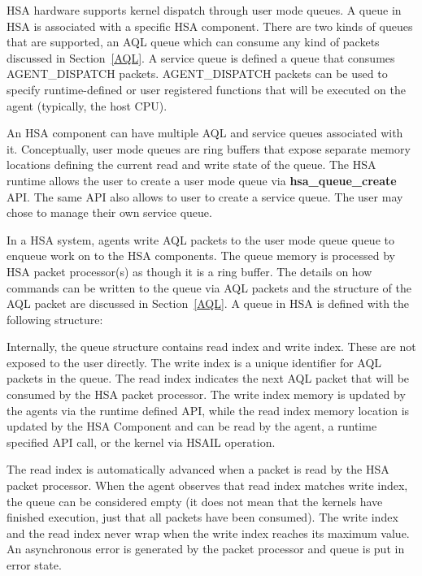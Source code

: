 \documentclass{book}
\newcommand{\reffun}[1]{\textbf{#1}}
\newcommand{\reftyp}[1]{#1}
\newcommand{\refenu}[1]{\reftyp{#1}}
\begin{document}
HSA hardware supports kernel dispatch through user mode queues.  A
queue in HSA is associated with a specific HSA component. There are
two kinds of queues that are supported, an AQL queue which can consume
any kind of packets discussed in Section~\ref{AQL}. A service queue is
defined a queue that consumes \refenu{AGENT\_DISPATCH}
packets. \refenu{AGENT\_DISPATCH} packets can be used to specify
runtime-defined or user registered functions that will be executed on
the agent (typically, the host CPU).

An HSA component can have multiple AQL and service queues associated
with it.  Conceptually, user mode queues are ring buffers that
expose separate memory locations defining the current read and write
state of the queue. The HSA runtime allows the user to create a user
mode queue via \reffun{hsa\_queue\_create} API. The same API also
allows to user to create a service queue. The user may chose to
manage their own service queue.

In a HSA system, agents write AQL packets to the user mode queue queue
to enqueue work on to the HSA components. The queue memory is
processed by HSA packet processor(s) as though it is a ring buffer.
The details on how commands can be written to the queue via AQL
packets and the structure of the AQL packet are discussed in
Section~\ref{AQL}. A queue in HSA is defined with the following
structure:



\vspace{-3mm}Internally, the queue structure contains read index and
write index.  These are not exposed to the user directly.  The write
index is a unique identifier for AQL packets in the queue. The read
index indicates the next AQL packet that will be consumed by the HSA
packet processor. The write index memory is updated by the agents via
the runtime defined API, while the read index memory location is
updated by the HSA Component and can be read by the agent, a runtime
specified API call, or the kernel via HSAIL operation.

The read index is automatically advanced when a packet is read by the
HSA packet processor. When the agent observes that read index matches
write index, the queue can be considered empty (it does not mean that
the kernels have finished execution, just that all packets have been
consumed). The write index and the read index never wrap when the
write index reaches its maximum value. An asynchronous error is
generated by the packet processor and queue is put in error state.
\end{document}
